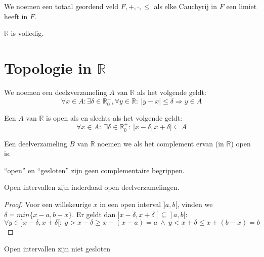 \documentclass[main.tex]{subfiles}
\begin{document}
\begin{de}
  We noemen een totaal geordend veld $F,+,\cdot,\le$  als elke Cauchyrij in $F$ een limiet heeft in $F$.
\end{de}

\begin{opm}
  $\mathbb{R}$ is volledig.
\end{opm}


\section{Topologie in $\mathbb{R}$}
\label{sec:topologie-mathbbr}

\begin{de}
  We noemen een deelzverzameling $A$ van $\mathbb{R}$  als het volgende geldt:
  \[ \forall x\in A: \exists \delta \in \mathbb{R}_{0}^{+}, \forall y\in \mathbb{R}:\ |y-x| \le \delta \Rightarrow y\in A \]
\end{de}

\begin{st}
  Een $A$ van $\mathbb{R}$ is open als en slechts als het volgende geldt:
  \[ \forall x\in A:\ \exists \delta \in \mathbb{R}_{0}^{+}:\ ]x-\delta,x+\delta[ \subseteq A \]

\end{st}

\begin{de}
  Een deelverzameling $B$ van $\mathbb{R}$ noemen we  als het complement ervan (in $\mathbb{R}$) open is.
\end{de}

\begin{opm}
  ``open'' en ``gesloten'' zijn geen complementaire begrippen.
\end{opm}

\begin{st}
  Open intervallen zijn inderdaad open deelverzamelingen.

  \begin{proof}
    Voor een willekeurige $x$ in een open interval $]a,b[$, vinden we $\delta = min\{x-a,b-x\}$.
    Er geldt dan $]x-\delta,x+\delta[ \subseteq ]a,b[$:
    \[ \forall y\in ]x-\delta,x+\delta[:\ y > x-\delta \ge x-(x-a) = a \ \wedge\ y < x+\delta \le x+(b-x) = b \]
  \end{proof}
\end{st}

\begin{st}
  Open intervallen zijn niet gesloten
\end{st}
\end{document}
